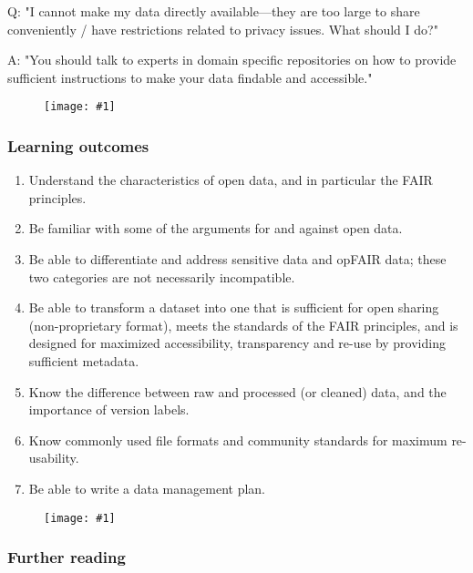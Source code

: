 \documentclass{article}
\newlength{\imgwidth}
\newcommand\scaledgraphics[2]{%
                
\settowidth{\imgwidth}{\texttt{[image: \#1]}}%
                
\setlength{\imgwidth}{\minof{\imgwidth}{#2\textwidth}}%
                
\texttt{[image: \#1]}%
                
}
\begin{document}
Q: "I cannot make my data directly available—they are too large to share conveniently / have restrictions related to privacy issues. What should I do?"


A: "You should talk to experts in domain specific repositories on how to provide sufficient instructions to make your data findable and accessible."

\begin{figure}
\scaledgraphics{78242a58-956c-4a6f-8d50-a93e47eb21b4.png}{1}
\label{F4458701}
\end{figure}


\subsubsection{Learning outcomes}\label{learning-outcomes}


\begin{enumerate}
\item Understand the characteristics of open data, and in particular the FAIR principles.


\item Be familiar with some of the arguments for and against open data.


\item Be able to differentiate and address sensitive data and opFAIR data; these two categories are not necessarily incompatible.


\item Be able to transform a dataset into one that is sufficient for open sharing (non-proprietary format), meets the standards of the FAIR principles, and is designed for maximized accessibility, transparency and re-use by providing sufficient metadata.


\item Know the difference between raw and processed (or cleaned) data, and the importance of version labels.


\item Know commonly used file formats and community standards for maximum re-usability.


\item Be able to write a data management plan.


\end{enumerate}
\begin{figure}
\scaledgraphics{28184297-5028-4ac9-bc5f-7a459edf50cf.png}{1}
\label{F90649891}
\end{figure}


\subsubsection{Further reading}\label{further-reading}
\end{document}

